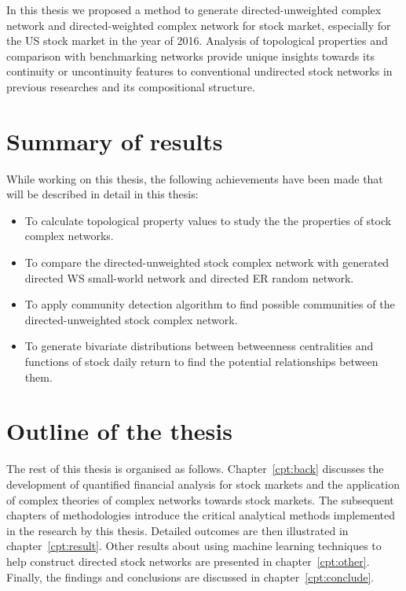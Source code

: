 In this thesis we proposed a method to generate directed-unweighted complex network and directed-weighted complex network for stock market, especially for the US stock market in the year of 2016. Analysis of topological properties and comparison with benchmarking networks provide unique insights towards its continuity or uncontinuity features to conventional undirected stock networks in previous researches and its compositional structure.

\section{Summary of results}
While working on this thesis, the following achievements have been made that will be described in detail in this thesis:

\begin{itemize}
	\item To calculate topological property values to study the the properties of stock complex networks.
	\item To compare the directed-unweighted stock complex network with generated directed WS small-world network and directed ER random network.
	\item To apply community detection algorithm to find possible communities of the directed-unweighted stock complex network.
	\item To generate bivariate distributions between betweenness centralities and functions of stock daily return to find the potential relationships between them.
\end{itemize}

\section{Outline of the thesis}
The rest of this thesis is organised as follows. Chapter~\ref{cpt:back} discusses the development of quantified financial analysis for stock markets and the application of complex theories of complex networks towards stock markets. The subsequent chapters of methodologies introduce the critical analytical methods implemented in the research by this thesis. Detailed outcomes are then illustrated in chapter~\ref{cpt:result}. Other results about using machine learning techniques to help construct directed stock networks are presented in chapter~\ref{cpt:other}. Finally, the findings and conclusions are discussed in chapter~\ref{cpt:conclude}.
